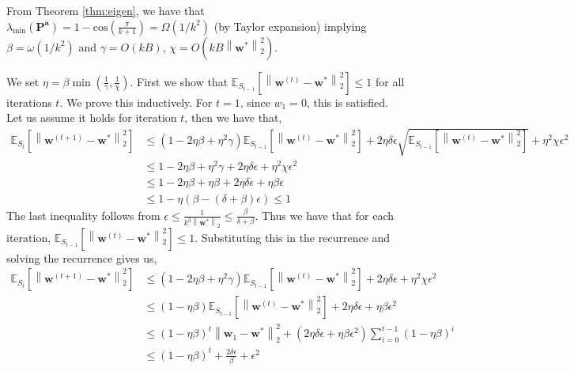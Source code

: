 \documentclass[11pt]{article}
\newcommand{\E}{\mathbb{E}}
\newcommand{\mat}[1]{\mathbf{#1}}
\newcommand{\vect}[1]{\mathbf{#1}}
\newcommand{\norm}[1]{\left\|#1\right\|}
\begin{document}
From Theorem \ref{thm:eigen}, we have that $\lambda_{\min}\left(\mat{P}^{\vect{a}}\right) = 1 - \text{cos}\left(\frac{\pi}{k+1}\right) = \Omega\left(1/k^2\right)$ (by Taylor expansion) implying $\beta = \omega\left(1/k^2\right)$ and $\gamma = O\left(kB\right)$, $\chi = O\left(kB\norm{\vect{w}^*}_2^2\right)$.

We set $\eta = \beta\min\left(\frac{1}{\gamma}, \frac{1}{\chi}\right)$. First we show that $\E_{S_{t-1}}[\norm{\vect{w}^{\left(t\right)} - \vect{w}^*}_2^2] \leq 1$ for all iterations $t$. We prove this inductively. For $t=1$, since $w_1 = 0$, this is satisfied. Let us assume it holds for iteration $t$, then we have that,
\begin{align*}
\E_{S_t}[\norm{\vect{w}^{\left(t+1\right)} - \vect{w}^*}_2^2] &\leq \left(1 - 2\eta \beta + \eta^2 \gamma\right)\E_{S_{t-1}}[\norm{\vect{w}^{\left(t\right)} - \vect{w}^*}_2^2] + 2\eta\delta \epsilon \sqrt{\E_{S_{t-1}}[\norm{\vect{w}^{\left(t\right)} - \vect{w}^*}_2^2]} + \eta^2 \chi \epsilon^2\\
&\leq 1 - 2\eta \beta + \eta^2 \gamma + 2\eta\delta \epsilon  + \eta^2 \chi \epsilon^2 \\
&\leq 1 - 2\eta \beta + \eta \beta + 2\eta\delta \epsilon  + \eta \beta \epsilon\\
& \leq 1 - \eta\left(\beta - \left(\delta + \beta\right)\epsilon\right) \leq 1
\end{align*}
The last inequality follows from $\epsilon \leq \frac{1}{k^3\norm{\vect{w}^*}_2} \leq \frac{\beta}{\delta + \beta}$. Thus we have that for each iteration, $\E_{S_{t-1}}[\norm{\vect{w}^{\left(t\right)} - \vect{w}^*}_2^2] \leq 1$. Substituting this in the recurrence and solving the recurrence gives us,
\begin{align*}
\E_{S_t}[\norm{\vect{w}^{\left(t+1\right)} - \vect{w}^*}_2^2] &\leq \left(1 - 2\eta \beta + \eta^2 \gamma\right)\E_{S_{t-1}}[\norm{\vect{w}^{\left(t\right)} - \vect{w}^*}_2^2] + 2\eta\delta \epsilon + \eta^2 \chi \epsilon^2\\
&\leq \left(1 - \eta \beta\right)\E_{S_{t-1}}[\norm{\vect{w}^{\left(t\right)} - \vect{w}^*}_2^2] + 2\eta\delta \epsilon + \eta \beta \epsilon^2\\
&\leq \left(1 - \eta \beta\right)^t\norm{\vect{w}_1 - \vect{w}^*}_2^2 + \left(2\eta\delta \epsilon + \eta \beta \epsilon^2\right)\sum_{i= 0}^{t-1} \left(1 - \eta \beta\right)^i\\
&\leq \left(1 - \eta \beta\right)^t + \frac{2\delta \epsilon}{\beta} + \epsilon^2
\end{align*}
\end{document}
